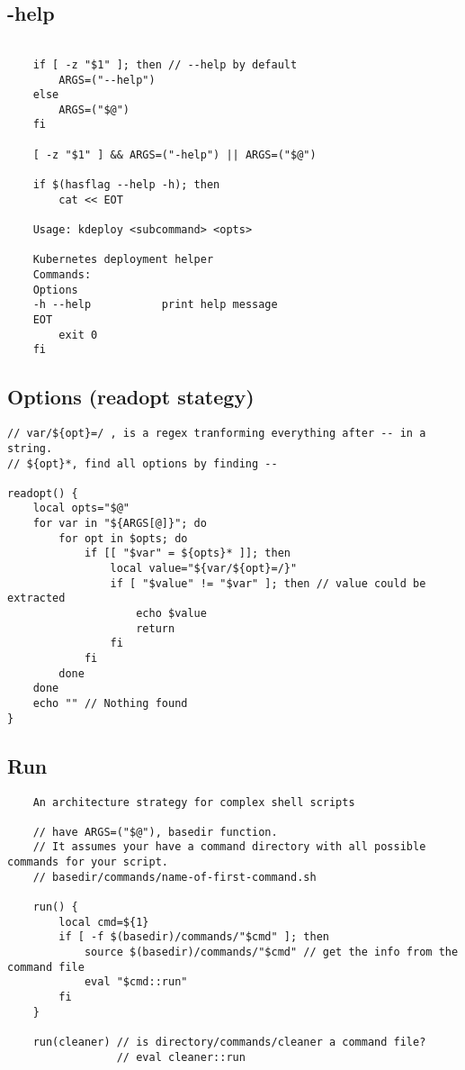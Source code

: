\subsection{-help}

\begin{verbatim}

    if [ -z "$1" ]; then // --help by default
        ARGS=("--help")
    else
        ARGS=("$@")
    fi

    [ -z "$1" ] && ARGS=("-help") || ARGS=("$@")

    if $(hasflag --help -h); then
        cat << EOT
    
    Usage: kdeploy <subcommand> <opts>
    
    Kubernetes deployment helper
    Commands:
    Options
    -h --help           print help message
    EOT
        exit 0
    fi
\end{verbatim}

\subsection{Options (readopt stategy)}

\begin{verbatim}
// var/${opt}=/ , is a regex tranforming everything after -- in a string. 
// ${opt}*, find all options by finding --

readopt() {
    local opts="$@"
    for var in "${ARGS[@]}"; do
        for opt in $opts; do
            if [[ "$var" = ${opts}* ]]; then
                local value="${var/${opt}=/}"
                if [ "$value" != "$var" ]; then // value could be extracted
                    echo $value
                    return
                fi
            fi
        done
    done
    echo "" // Nothing found
}
\end{verbatim}

\subsection{Run}

\begin{verbatim}
    An architecture strategy for complex shell scripts

    // have ARGS=("$@"), basedir function. 
    // It assumes your have a command directory with all possible commands for your script. 
    // basedir/commands/name-of-first-command.sh

    run() {
        local cmd=${1}
        if [ -f $(basedir)/commands/"$cmd" ]; then
            source $(basedir)/commands/"$cmd" // get the info from the command file
            eval "$cmd::run"
        fi
    }

    run(cleaner) // is directory/commands/cleaner a command file?
                 // eval cleaner::run
\end{verbatim}

